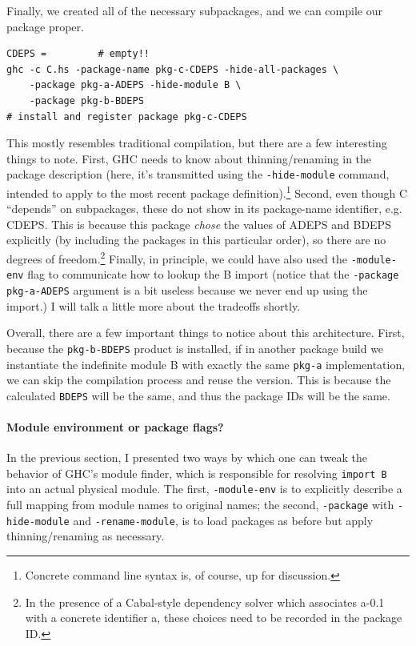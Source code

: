 \documentclass{article}
\begin{document}
Finally, we created all of the necessary subpackages, and we can compile
our package proper.

\begin{verbatim}
CDEPS =         # empty!!
ghc -c C.hs -package-name pkg-c-CDEPS -hide-all-packages \
    -package pkg-a-ADEPS -hide-module B \
    -package pkg-b-BDEPS
# install and register package pkg-c-CDEPS
\end{verbatim}

This mostly resembles traditional compilation, but there are a few
interesting things to note.  First, GHC needs to know about thinning/renaming
in the package description (here, it's transmitted using the \verb|-hide-module|
command, intended to apply to the most recent package definition).\footnote{Concrete
command line syntax is, of course, up for discussion.}  Second, even though C
``depends'' on subpackages, these do not show in its package-name identifier,
e.g. CDEPS\@.  This is because this package \emph{chose} the values of ADEPS and BDEPS
explicitly (by including the packages in this particular order), so there are no
degrees of freedom.\footnote{In the presence of a Cabal-style dependency solver
which associates a-0.1 with a concrete identifier a, these choices need to be
recorded in the package ID.}  Finally, in principle, we could have also used
the \verb|-module-env| flag to communicate how to lookup the B import (notice
that the \verb|-package pkg-a-ADEPS| argument is a bit useless because we
never end up using the import.)  I will talk a little more about the tradeoffs
shortly.

Overall, there are a few important things to notice about this architecture.
First, because the \verb|pkg-b-BDEPS| product is installed, if in another package
build we instantiate the indefinite module B with exactly the same \verb|pkg-a|
implementation, we can skip the compilation process and reuse the version.
This is because the calculated \verb|BDEPS| will be the same, and thus the package
IDs will be the same.

\paragraph{Module environment or package flags?}  In the previous
section, I presented two ways by which one can tweak the behavior of
GHC's module finder, which is responsible for resolving \verb|import B|
into an actual physical module.  The first, \verb|-module-env| is to
explicitly describe a full mapping from module names to original names;
the second, \verb|-package| with \verb|-hide-module| and
\verb|-rename-module|, is to load packages as before but apply
thinning/renaming as necessary.
\end{document}
